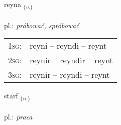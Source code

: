 \documentclass[frontgrid, backgrid]{flacards}\usepackage[]{graphicx}\usepackage[]{xcolor}
\begin{document}
\renewcommand{\flhead}{\vskip5pt \fboxsep=0pt {\small\bfseries\footnotesize Sagnorð | Verb}}
\renewcommand{\fcfoot}{\vskip5pt \fboxsep=0pt \hspace{2pt}{\small\bfseries\footnotesize 1K}}

\renewcommand{\blhead}{\vskip5pt {\small\bfseries\footnotesize Sagnorð | Verb }}
\renewcommand{\bcfoot}{\vskip5pt \hspace{2pt}{\small\bfseries\footnotesize 1K}}


{reyna \small{\textsubscript{(\textit{v.})}} \\[1ex] %
\textphonetic{[reiːna]} \\
pl.: \emph{próbować, spróbować} \\  [2ex]
\renewcommand*{\arraystretch}{0.8}
\begin{tabular}{p{1cm}l}
\textsc{1sg}: & reyni -- reyndi -- reynt \\ 
\textsc{2sg}: & reynir -- reyndir -- reynt \\ 
\textsc{3sg}: & reynir -- reyndi -- reynt \\ 
\end{tabular}
}

\renewcommand{\flhead}{\vskip5pt \fboxsep=0pt {\small\bfseries\footnotesize Nafnorð | Noun}}
\renewcommand{\fcfoot}{\vskip5pt \fboxsep=0pt \hspace{2pt}{\small\bfseries\footnotesize 1K}}

\renewcommand{\blhead}{\vskip5pt {\small\bfseries\footnotesize Nafnorð | Noun }}
\renewcommand{\bcfoot}{\vskip5pt \hspace{2pt}{\small\bfseries\footnotesize 1K}}


{starf \small{\textsubscript{(\textit{n.})}} \\[1ex] %
\textphonetic{[starv]} \\
pl.: \emph{praca} \\  [2ex]
\renewcommand*{\arraystretch}{0.8}
}
\end{document}
